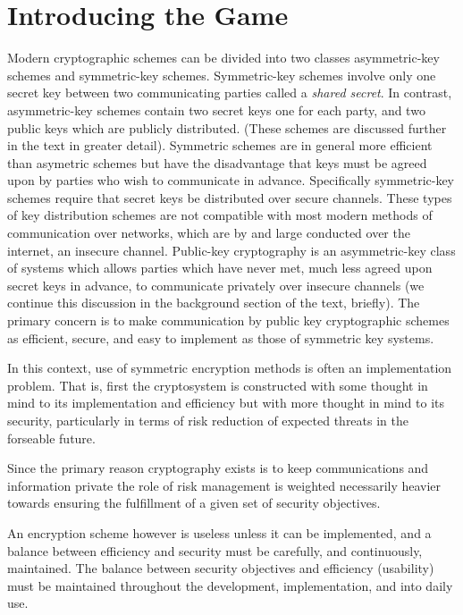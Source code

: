 \chapter{Introducing the Game}

Modern cryptographic schemes can be divided into two classes
asymmetric-key schemes and symmetric-key schemes. 
Symmetric-key schemes involve only one secret key between two communicating parties called a \emph{shared secret}. In contrast, asymmetric-key schemes contain two secret keys one for each party, and two public keys which are publicly distributed. (These schemes are discussed further in the text in greater detail).
\smallskip
Symmetric schemes are in general more efficient than asymetric
schemes but have the disadvantage that keys must be agreed upon by
parties who wish to communicate in advance. Specifically symmetric-key
schemes require that secret keys be distributed over secure channels.
These types of key distribution schemes are not compatible with most
modern methods of communication over networks, which are by and large
conducted over the internet, an insecure channel.
\smallskip
Public-key cryptography is an asymmetric-key class of systems which
allows parties which have never met, much less agreed upon secret keys
in advance, to communicate privately over insecure channels (we
continue this discussion in the background section of the text,
briefly). The primary concern is to make communication by public key
cryptographic schemes as efficient, secure, and easy to implement as
those of symmetric key systems.
\smallskip

In this context, use of symmetric encryption methods is often an implementation problem. 
That is, first the cryptosystem is constructed with some
thought in mind to its implementation and efficiency but with more
thought in mind to its security, particularly in terms of risk reduction of expected threats in the forseable future.

Since the primary reason cryptography exists is to keep
communications and information private the role of risk management is
weighted necessarily heavier towards ensuring the fulfillment of a
given set of security objectives.

An encryption scheme however is useless unless it can be implemented,
and a balance between efficiency and security must be carefully, and
continuously, maintained. The balance between security objectives and efficiency (usability) must be maintained throughout the development, implementation, and into daily use.

